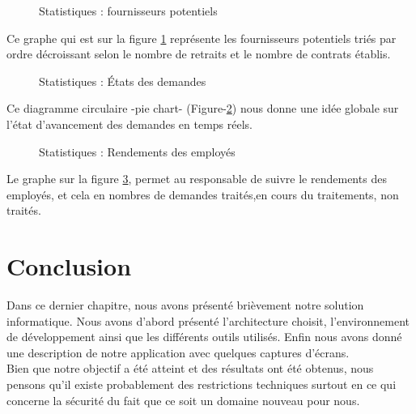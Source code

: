 \documentclass{report}
\begin{document}
\newpage
\vspace{1cm}
\begin{figure}[h]
        \centering
        \caption{Statistiques : fournisseurs potentiels}
        \label{14}
\end{figure}
Ce graphe qui est sur la figure \ref{14} représente les fournisseurs potentiels triés par ordre décroissant selon le nombre de retraits et le nombre de contrats établis.
\vspace{1.5cm}

\begin{figure}[h]
        \centering
        \caption{Statistiques : États des demandes}
        \label{15}
\end{figure}
Ce diagramme circulaire -pie chart- (Figure-\ref{15}) nous donne une idée globale sur l'état d'avancement des demandes en temps réels.
\newpage
\begin{figure}[h]
        \centering
        \caption{Statistiques : Rendements des employés}
        \label{16}
\end{figure}
Le graphe sur la figure \ref{16}, permet au responsable de suivre le rendements des employés, et cela en nombres de demandes traités,en cours du traitements, non traités.
\vspace{2cm}
\section{Conclusion}
Dans ce dernier chapitre, nous avons présenté brièvement notre solution informatique. Nous avons d’abord présenté l’architecture choisit, l’environnement de développement ainsi que les différents outils utilisés.
Enfin nous avons donné une description de notre application avec quelques captures d'écrans.\\
Bien que notre objectif a été atteint et des résultats ont été obtenus, nous pensons qu’il existe probablement des restrictions techniques surtout en ce qui concerne la sécurité du fait que ce soit un domaine nouveau pour nous.



\end{document}
